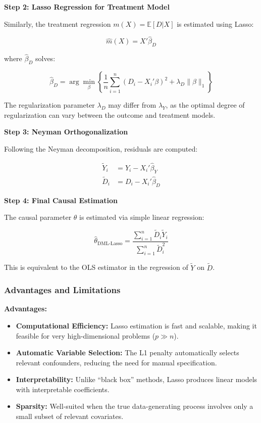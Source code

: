 \documentclass[12pt,a4paper]{article}
\begin{document}
\textbf{Step 2: Lasso Regression for Treatment Model}

Similarly, the treatment regression $m(X) = \mathbb{E}[D | X]$ is estimated using Lasso:

\begin{equation}
\hat{m}(X) = X'\hat{\beta}_D
\end{equation}

where $\hat{\beta}_D$ solves:

\begin{equation}
\hat{\beta}_D = \arg\min_{\beta} \left\{ \frac{1}{n} \sum_{i=1}^{n} (D_i - X_i'\beta)^2 + \lambda_D \|\beta\|_1 \right\}
\end{equation}

The regularization parameter $\lambda_D$ may differ from $\lambda_Y$, as the optimal degree of regularization can vary between the outcome and treatment models.

\textbf{Step 3: Neyman Orthogonalization}

Following the Neyman decomposition, residuals are computed:

\begin{align}
\tilde{Y}_i &= Y_i - X_i'\hat{\beta}_Y \\
\tilde{D}_i &= D_i - X_i'\hat{\beta}_D
\end{align}

\textbf{Step 4: Final Causal Estimation}

The causal parameter $\theta$ is estimated via simple linear regression:

\begin{equation}
\hat{\theta}_{\text{DML-Lasso}} = \frac{\sum_{i=1}^{n} \tilde{D}_i \tilde{Y}_i}{\sum_{i=1}^{n} \tilde{D}_i^2}
\end{equation}

This is equivalent to the OLS estimator in the regression of $\tilde{Y}$ on $\tilde{D}$.

\subsubsection{Advantages and Limitations}

\textbf{Advantages:}
\begin{itemize}
\item \textbf{Computational Efficiency:} Lasso estimation is fast and scalable, making it feasible for very high-dimensional problems ($p \gg n$).
\item \textbf{Automatic Variable Selection:} The L1 penalty automatically selects relevant confounders, reducing the need for manual specification.
\item \textbf{Interpretability:} Unlike ``black box'' methods, Lasso produces linear models with interpretable coefficients.
\item \textbf{Sparsity:} Well-suited when the true data-generating process involves only a small subset of relevant covariates.
\end{itemize}
\end{document}
